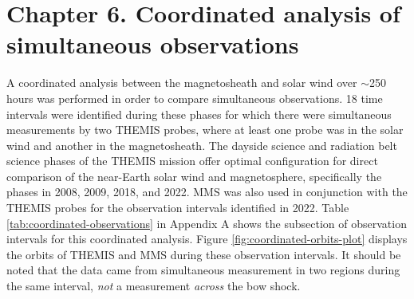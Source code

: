 \chapter{Chapter 6. Coordinated analysis of simultaneous observations}
A coordinated analysis between the magnetosheath and solar wind over $\sim$250 hours was performed in order to compare simultaneous observations. 18 time intervals were identified during these phases for which there were simultaneous measurements by two THEMIS probes, where at least one probe was in the solar wind and another in the magnetosheath. The dayside science and radiation belt science phases of the THEMIS mission offer optimal configuration for direct comparison of the near-Earth solar wind and magnetosphere, specifically the phases in 2008, 2009, 2018, and 2022. MMS was also used in conjunction with the THEMIS probes for the observation intervals identified in 2022. Table \ref{tab:coordinated-observations} in Appendix A shows the subsection of observation intervals for this coordinated analysis. Figure \ref{fig:coordinated-orbits-plot} displays the orbits of THEMIS and MMS during these observation intervals. It should be noted that the data came from simultaneous measurement in two regions during the same interval, \textit{not} a measurement \textit{across} the bow shock. %

